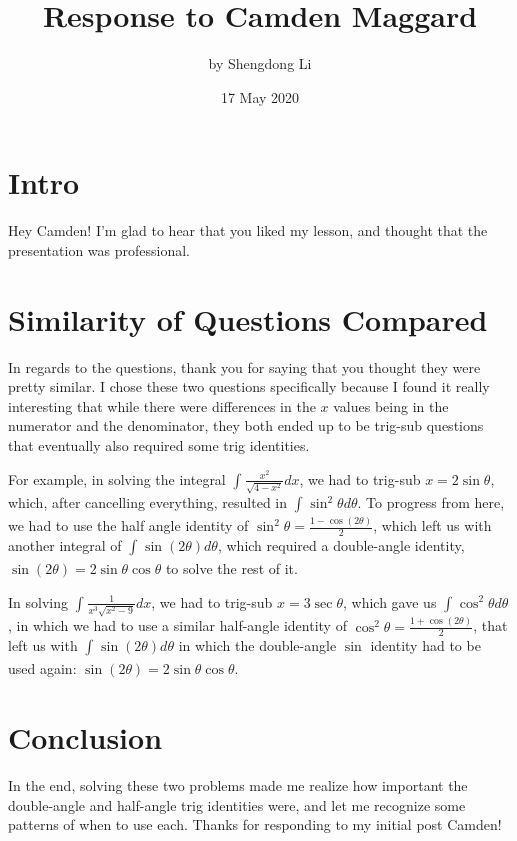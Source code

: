 \documentclass[letterpaper, 12pt]{article}
\begin{document}
\title{Response to Camden Maggard}
\author{by Shengdong Li}
\date{17 May 2020}
\maketitle

\section{Intro}
Hey Camden! I'm glad to hear that you liked my lesson, and thought that the presentation was professional. 
\section{Similarity of Questions Compared}
In regards to the questions, thank you for saying that you thought they were pretty similar. I chose these two questions specifically because I found it really interesting that while there were differences in the $x$ values being in the numerator and the denominator, they both ended up to be trig-sub questions that eventually also required some trig identities. \par
For example, in solving the integral $\int_{ }^{ }\frac{x^{2}}{\sqrt{4-x^{2}}}dx$, we had to trig-sub $x=2\sin\theta$, which, after cancelling everything, resulted in $\int_{ }^{ }\sin^{2}\theta d\theta$. To progress from here, we had to use the half angle identity of $\sin^{2}\theta=\frac{1-\cos\left(2\theta\right)}{2}$, which left us with another integral of $\int_{ }^{ }\sin\left(2\theta\right)d\theta$, which required a double-angle identity, $\sin\left(2\theta\right)=2\sin\theta\cos\theta$ to solve the rest of it. \par
In solving $\int_{ }^{ }\frac{1}{x^{3}\sqrt{x^{2}-9}}dx$, we had to trig-sub $x=3\sec\theta$, which gave us $\int_{ }^{ }\cos^{2}\theta d\theta$, in which we had to use a similar half-angle identity of $\cos^{2}\theta=\frac{1+\cos\left(2\theta\right)}{2}$, that left us with $\int_{ }^{ }\sin\left(2\theta\right)d\theta$ in which the double-angle $\sin$ identity had to be used again: $\sin\left(2\theta\right)=2\sin\theta\cos\theta$.
\section{Conclusion}
In the end, solving these two problems made me realize how important the double-angle and half-angle trig identities were, and let me recognize some patterns of when to use each. Thanks for responding to my initial post Camden!
\end{document}
